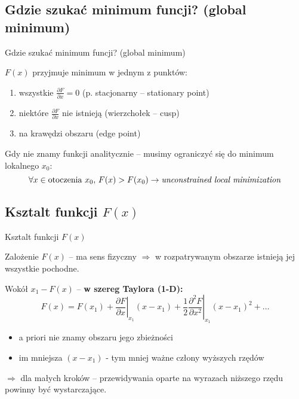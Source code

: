 \subsection{Gdzie szukać minimum funcji? (global minimum)}

  \begin{frame}{Gdzie szukać minimum funcji? (global minimum)}
    \begin{block}{$ F(x) $ przyjmuje minimum w jednym z punktów:}
      \begin{enumerate}
        \item wszystkie $ \frac{\partial F}{\partial x} = 0 $
        (p. stacjonarny -- stationary point)
        \item niektóre $ \frac{\partial F}{\partial x} $
        nie istnieją (wierzchołek -- cusp)
        \item na krawędzi obszaru (edge point)
      \end{enumerate}
    \end{block}
    Gdy nie znamy funkcji analitycznie -- musimy ograniczyć
    się do minimum lokalnego $ x_0 $:
    \begin{displaymath}
      \forall x \in \text{otoczenia}\ x_0{,}\ F(x) > F(x_0)
      \to \text{\emph{unconstrained local minimization}}
    \end{displaymath}
  \end{frame}

\subsection{Ksztalt funkcji $ F(x) $}
  \begin{frame}{Ksztalt funkcji $ F(x) $}
    \begin{block}{Zalożenie}
      $ F(x) $ -- ma sens fizyczny $ \Rightarrow $ w rozpatrywanym
      obszarze istnieją jej wszystkie pochodne.
    \end{block}
    Wokół $ x_1 - F(x) $ -- \textbf{w szereg Taylora (1-D):}
    \begin{displaymath}
      F(x) = F(x_1) + \left. \frac{\partial F}{\partial x} \right|_{x_1}(x - x_1) +
      \left. \frac{1}{2} \frac{\partial^2 F}{\partial x^2} \right|_{x_1}(x - x_1)^2 +
      \dots
    \end{displaymath}
    \begin{itemize}
      \item a priori nie znamy obszaru jego zbieżności
      \item im mniejsza $ (x - x_1) $ - tym mniej ważne człony
      wyższych rzędów
    \end{itemize}
    $ \Rightarrow $ dla małych kroków -- przewidywania oparte
    na wyrazach niższego rzędu powinny być wystarczające.

  \end{frame}

